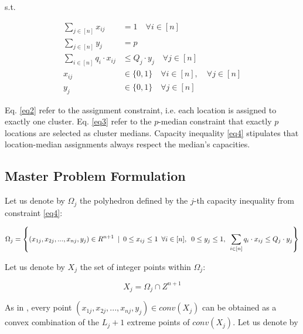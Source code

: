 \documentclass[
	11pt,
	DIV10,
	ngerman,
	a4paper,
	oneside,
	headings=normal,
	captions=tableheading,
	final,
	numbers=noenddot
]{scrartcl}
\begin{document}
s.t.

\begin{align}
	\label{eq2}	\sum_{j \in [n]} x_{ij} &= 1 \quad \forall i \in [n] \\[1em]
	\label{eq3} \sum_{j \in [n]} y_{j} &= p \\[1em]
	\label{eq4} \sum_{i \in [n]} q_{i} \cdot x_{ij} &\leq Q_{j} \cdot y_{j} \quad \forall j \in [n] \\[1em]
	x_{ij} &\in \{0, 1\} \quad \forall i \in [n], \quad \forall j \in [n] \nonumber \\[1em]
	y_{j} &\in \{0, 1\} \quad \forall j \in [n] \nonumber
\end{align}

Eq. \eqref{eq2} refer to the assignment constraint, i.e. each location is assigned to exactly one cluster. Eq. \eqref{eq3} refer to the $ p $-median constraint that exactly $ p $ locations are selected as cluster medians. Capacity inequality \eqref{eq4} stipulates that location-median assignments always respect the median's capacities.

\subsection{Master Problem Formulation}

Let us denote by $ \Omega_{j} $ the polyhedron defined by the $ j $-th capacity inequality from constraint \eqref{eq4}:

\small

\begin{equation}
	\Omega_{j} = \left\{(x_{1j}, x_{2j}, ..., x_{nj}, y_{j}) \in R^{n + 1} \hspace{0.5em} | \hspace{0.5em} 0 \leq x_{ij} \leq 1 \hspace{0.5em} \forall i \in [n], \hspace{0.5em} 0 \leq y_{j} \leq 1, \hspace{0.5em} \sum_{i \in [n]} q_{i} \cdot x_{ij} \leq Q_{j} \cdot y_{j}\right\} \nonumber
\end{equation}

\normalsize

Let us denote by $ X_{j} $ the set of integer points within $ \Omega_{j} $:

\begin{equation}
	X_{j} = \Omega_{j} \cap Z^{n + 1} \nonumber
\end{equation}

As in \cite{ceselli2005branch}, every point $ (x_{1j}, x_{2j}, ..., x_{nj}, y_{j}) \in conv(X_{j}) $ can be obtained as a convex combination of the $ L_{j} + 1 $ extreme points of $ conv(X_{j}) $. Let us denote by
\end{document}

